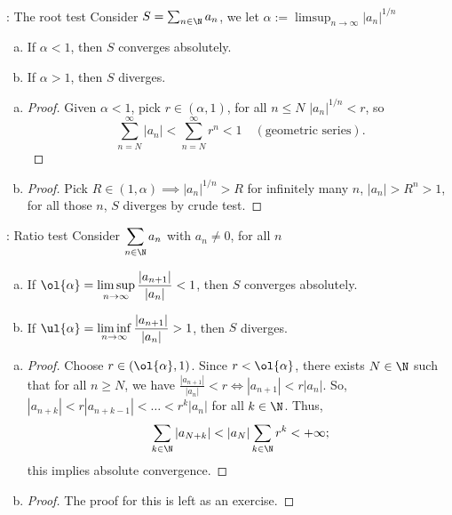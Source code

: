 \begin{ntheorem}{: The root test}
	Consider \(S=\sum_{n\in\N}a_n\), we let \(\alpha:=\displaystyle\limsup_{n\to\infty}|a_n|^{1/n}\)
	\begin{enumerate}[(a)]
		\item If \(\alpha<1\), then \(S\) converges absolutely.
		
		\item If \(\alpha>1\), then \(S\) diverges.
	\end{enumerate}
\end{ntheorem}
\begin{enumerate}[(a)]
	\item 
	\begin{proof}
		Given \(\alpha<1\), pick \(r\in(\alpha,1)\), for all \(n\leq N\) \(|a_n|^{1/n}<r\), so 
		\begin{equation*}
			\sum_{n=N}^{\infty}|a_n|<\sum_{n=N}^{\infty}r^n<1\quad(\text{geometric series}).
		\end{equation*}
	\end{proof}
	
	\item 
	\begin{proof}
		Pick \(R\in(1,\alpha)\implies|a_n|^{1/n}>R\) for infinitely many \(n\), \(|a_n|>R^n>1\), for all those \(n\), \(S\) diverges by crude test.
	\end{proof}
\end{enumerate}

\begin{ntheorem}{: Ratio test}
	Consider \(\displaystyle\sum_{n\in\N}a_n\) with \(a_n\neq 0\), for all \(n\)
	\begin{enumerate}[(a)]
		\item If \(\ol{\alpha}=\displaystyle\limsup_{n\to\infty}\displaystyle\frac{|a_{n+1}|}{|a_n|}<1\), then \(S\) converges absolutely.
		
		\item If \(\ul{\alpha}=\displaystyle\liminf_{n\to\infty}\displaystyle\frac{|a_{n+1}|}{|a_n|}>1\), then \(S\) diverges.
	\end{enumerate}
\end{ntheorem}
\begin{enumerate}[(a)]
	\item 
	\begin{proof}
		Choose \(r\in(\ol{\alpha},1)\). Since \(r<\ol{\alpha}\), there exists \(N\in\N\) such that for all \(n\geq N\), we have \(\displaystyle\frac{|a_{n+1}|}{|a_n|}<r\iff |a_{n+1}|<r|a_n|\). So, \(|a_{n+k}|<r|a_{n+k-1}|<\dots<r^k|a_n|\) for all \(k\in\N\). Thus,
		\begin{equation*}
			\sum_{k\in\N}|a_{N+k}|<|a_N|\sum_{k\in\N}r^k<+\infty;
		\end{equation*}
		this implies absolute convergence.
	\end{proof}
	
	\item 
	\begin{proof}
		The proof for this is left as an exercise.
	\end{proof}
\end{enumerate}

